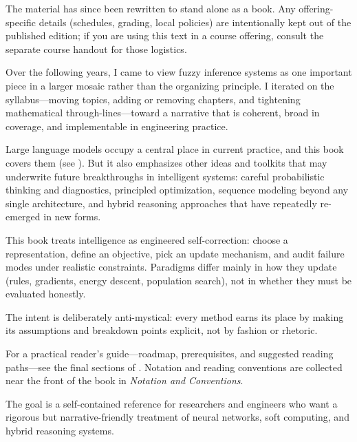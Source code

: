 The material has since been rewritten to stand alone as a book. Any offering-specific details (schedules, grading, local policies) are intentionally kept out of the published edition; if you are using this text in a course offering, consult the separate course handout for those logistics.

Over the following years, I came to view fuzzy inference systems as one important piece in a larger mosaic rather than the organizing principle. I iterated on the syllabus---moving topics, adding or removing chapters, and tightening mathematical through-lines---toward a narrative that is coherent, broad in coverage, and implementable in engineering practice.

Large language models occupy a central place in current practice, and this book covers them (see ). But it also emphasizes other ideas and toolkits that may underwrite future breakthroughs in intelligent systems: careful probabilistic thinking and diagnostics, principled optimization, sequence modeling beyond any single architecture, and hybrid reasoning approaches that have repeatedly re-emerged in new forms.

\begin{tcolorbox}[perspectivebox]
This book treats intelligence as engineered self-correction: choose a representation,
define an objective, pick an update mechanism, and audit failure modes under realistic
constraints. Paradigms differ mainly in how they update (rules, gradients, energy descent,
population search), not in whether they must be evaluated honestly.

The intent is deliberately anti-mystical: every method earns its place by making its
assumptions and breakdown points explicit, not by fashion or rhetoric.

For a practical reader's guide---roadmap, prerequisites, and suggested reading paths---see
the final sections of . Notation and reading conventions are collected
near the front of the book in \emph{Notation and Conventions}.

The goal is a self-contained reference for researchers and engineers who want a rigorous
but narrative-friendly treatment of neural networks, soft computing, and hybrid reasoning systems.
\end{tcolorbox}
